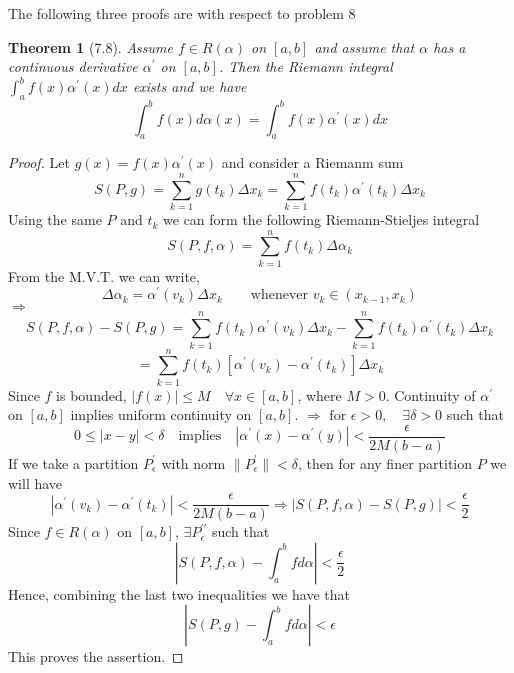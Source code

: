 \documentclass[aps,pra,notitlepage,amsmath,amssymb,letterpaper,12pt]{revtex4-1}
\newtheorem{theorem}{Theorem}
\begin{document}
The following three proofs are with respect to problem 8
\begin{theorem}[7.8]
Assume $f \in R(\alpha)$ on $[a,b]$ and assume that $\alpha$ has a continuous derivative $\alpha^\prime$ on $[a,b]$. Then the Riemann integral $\int_{a}^{b} f(x) \alpha^\prime(x)dx$ exists and we have
\[\int_{a}^{b} f(x) d\alpha(x) = \int_{a}^{b} f(x) \alpha^\prime(x)dx\]
\end{theorem}
\begin{proof}
Let $g(x) = f(x)\alpha^\prime(x)$ and consider a Riemanm sum
$$S(P,g) = \sum_{k=1}^{n}g(t_{k})\Delta x_{k} = \sum_{k=1}^{n}f(t_{k})\alpha^\prime(t_{k})\Delta x_{k}$$
Using the same $P$ and $t_{k}$ we can form the following Riemann-Stieljes integral
$$S(P,f,\alpha) =  \sum_{k=1}^{n}f(t_{k})\Delta \alpha_{k}$$
From the M.V.T. we can write,
$$\Delta \alpha_{k} = \alpha^\prime(v_{k}) \Delta x_{k} \qquad \textrm{whenever } v_{k} \in (x_{k-1},x_{k}) $$
$\Longrightarrow$
$$S(P,f,\alpha)-S(P,g) =  \sum_{k=1}^{n}f(t_{k})\alpha^\prime(v_{k}) \Delta x_{k} - \sum_{k=1}^{n}f(t_{k})\alpha^\prime(t_{k})\Delta x_{k} $$
$$= \sum_{k=1}^{n}f(t_{k})[\alpha^\prime(v_{k})-\alpha^\prime(t_{k})]\Delta x_{k}$$
Since $f$ is bounded, $\left|f(x)\right| \leq M \quad \forall x \in [a,b]$, where $M > 0$. Continuity of $\alpha^\prime$ on $[a,b]$ implies uniform continuity on $[a,b]$.
$\Rightarrow \textrm{ for } \epsilon > 0, \quad \exists \delta > 0 $ such that
$$ 0 \leq \left| x - y \right| < \delta \quad \textrm{implies} \quad \left| \alpha^\prime(x)- \alpha^\prime(y) \right| < \frac{\epsilon}{2M(b-a)}$$
If we take a partition $P_{\epsilon}^{\prime}$ with norm $\|P_{\epsilon}^{\prime}\| < \delta$, then for any finer partition $P$ we will have
$$\left| \alpha^\prime(v_{k})- \alpha^\prime(t_{k}) \right| < \frac{\epsilon}{2M(b-a)} \Rightarrow \left| S(P,f,\alpha)-S(P,g) \right| < \frac{\epsilon}{2}$$
Since $f \in R(\alpha)$ on $[a,b]$, $\exists P_{\epsilon}^{\prime \prime}$ such that
$$ \left| S(P,f,\alpha)-\int_{a}^{b}fd\alpha \right| < \frac{\epsilon}{2} $$
Hence, combining the last two inequalities we have that
$$ \left| S(P,g)-\int_{a}^{b}fd\alpha \right| < \epsilon $$
This proves the assertion.
\end{proof}
\end{document}
